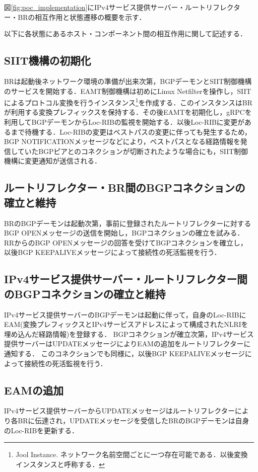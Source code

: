 図\ref{fig:poc_implementation}にIPv4サービス提供サーバー・ルートリフレクター・BRの相互作用と状態遷移の概要を示す．

以下に各状態にあるホスト・コンポーネント間の相互作用に関して記述する．

\subsection{SIIT機構の初期化}
BRは起動後ネットワーク環境の準備が出来次第，BGPデーモンとSIIT制御機構のサービスを開始する．EAMT制御機構は初めにLinux Netfilterを操作し，SIITによるプロトコル変換を行うインスタンス\footnote{Jool Instance. ネットワーク名前空間ごとに一つ存在可能である．以後変換インスタンスと呼称する．}を作成する．このインスタンスはBRが利用する変換プレフィックスを保持する．その後EAMTを初期化し，gRPCを利用してBGPデーモンからLoc-RIBの監視を開始する．以後Loc-RIBに変更があるまで待機する．Loc-RIBの変更はベストパスの変更に伴っても発生するため，BGP NOTIFICATIONメッセージなどにより，ベストパスとなる経路情報を発信していたBGPピアとのコネクションが切断されたような場合にも，SIIT制御機構に変更通知が送信される．


\subsection{ルートリフレクター・BR間のBGPコネクションの確立と維持}
BRのBGPデーモンは起動次第，事前に登録されたルートリフレクターに対するBGP OPENメッセージの送信を開始し，BGPコネクションの確立を試みる．
RRからのBGP OPENメッセージの回答を受けてBGPコネクションを確立し，以後BGP KEEPALIVEメッセージによって接続性の死活監視を行う．



\subsection{IPv4サービス提供サーバー・ルートリフレクター間のBGPコネクションの確立と維持}
IPv4サービス提供サーバーのBGPデーモンは起動に伴って，自身のLoc-RIBにEAM(変換プレフィックスとIPv4サービスアドレスによって構成されたNLRIを埋め込んだ経路情報)を登録する．
BGPコネクションが確立次第，IPv4サービス提供サーバーはUPDATEメッセージによりEAMの追加をルートリフレクターに通知する．
このコネクションでも同様に，以後BGP KEEPALIVEメッセージによって接続性の死活監視を行う．


\subsection{EAMの追加}
IPv4サービス提供サーバーからUPDATEメッセージはルートリフレクターにより各BRに伝達され，UPDATEメッセージを受信したBRのBGPデーモンは自身のLoc-RIBを更新する．

